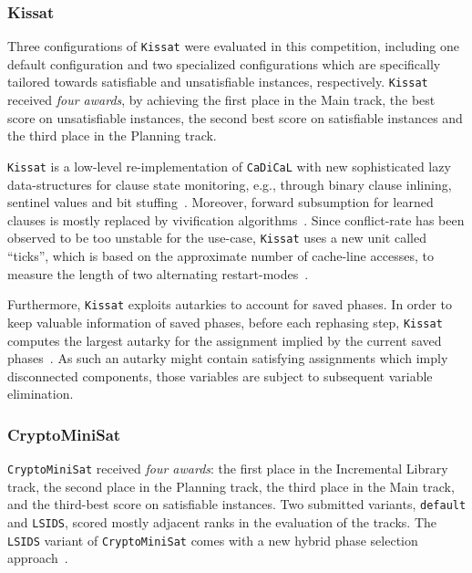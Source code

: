 \documentclass{elsarticle}
\newcommand{\solver}[1]{\texttt{#1}}
\begin{document}
\subsubsection{Kissat} 
\label{sec:kissat}

Three configurations of \solver{Kissat} were evaluated in this competition, including one default configuration and two specialized configurations which are specifically tailored towards satisfiable and unsatisfiable instances, respectively. 
\solver{Kissat} received \emph{four awards}, by achieving the first place in the Main track, 
the best score on unsatisfiable instances, the second best score on satisfiable instances and the third place in the Planning track. 

\solver{Kissat} is a low-level re-implementation of \solver{CaDiCaL} with new sophisticated lazy data-structures for clause state monitoring, e.g., through binary clause inlining, sentinel values and bit stuffing~\cite{Biere:SC2019,Biere:SC2020}. 
Moreover, forward subsumption for learned clauses is mostly replaced by vivification algorithms~\cite{ChuMinLi:2020:Vivification}. 
Since conflict-rate has been observed to be too unstable for the use-case, \solver{Kissat} uses a new unit called ``ticks'', which is based on the approximate number of cache-line accesses, to measure the length of two alternating restart-modes~\cite{Biere:SC2020}. 

Furthermore, \solver{Kissat} exploits autarkies to account for saved phases. 
In order to keep valuable information of saved phases, before each rephasing step, \solver{Kissat} computes the largest autarky for the assignment implied by the current saved phases~\cite{Kiesl:2019:Autarkies}. 
As such an autarky might contain satisfying assignments which imply disconnected components, those variables are subject to subsequent variable elimination. 


\subsubsection{CryptoMiniSat}
\label{sec:cryptominisat}

\solver{CryptoMiniSat} received \emph{four awards}: the first place in the Incremental Library track,
the second place in the Planning track, the third place in the Main track, and the third-best score on satisfiable instances. 
Two submitted variants, \solver{default} and \solver{LSIDS}, scored mostly adjacent ranks in the evaluation of the tracks. 
The \solver{LSIDS} variant of \solver{CryptoMiniSat} comes with a new hybrid phase selection approach~\cite{Shaw:2020:LSIDS,Soos:SC2020}.
\end{document}
